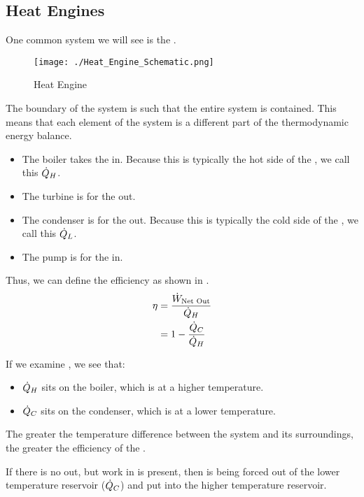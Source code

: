 \subsection{Heat Engines}\label{subsec:Heat_Engines}
One common system we will see is the .
\begin{figure}[h!tbp]
  \centering
  \texttt{[image: ./Heat\_Engine\_Schematic.png]}
  \caption{Heat Engine}
  \label{fig:Heat_Engine}
\end{figure}

The boundary of the system is such that the entire system is contained.
This means that each element of the system is a different part of the thermodynamic energy balance.
\begin{itemize}[noitemsep]
\item The boiler takes the  in.
  Because this is typically the hot side of the , we call this $\dot{Q}_{H}$.
\item The turbine is for the  out.
\item The condenser is for the  out.
  Because this is typically the cold side of the , we call this $\dot{Q}_{L}$.
\item The pump is for the  in.
\end{itemize}

Thus, we can define the efficiency as shown in .
\begin{equation}\label{eq:Energy_Efficiency-Heat_Engine}
  \begin{aligned}
    \eta &= \frac{\dot{W}_{\text{Net Out}}}{\dot{Q}_{H}} \\
    &= 1 - \frac{\dot{Q}_{C}}{\dot{Q}_{H}}
  \end{aligned}
\end{equation}

If we examine , we see that:
\begin{itemize}[noitemsep]
\item $\dot{Q}_{H}$ sits on the boiler, which is at a higher temperature.
\item $\dot{Q}_{C}$ sits on the condenser, which is at a lower temperature.
\end{itemize}
The greater the temperature difference between the system and its surroundings, the greater the efficiency of the .

If there is no  out, but work in is present, then  is being forced out of the lower temperature reservoir ($\dot{Q}_{C}$) and put into the higher temperature reservoir.

